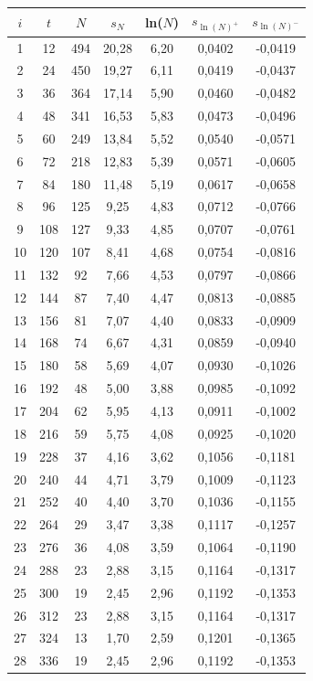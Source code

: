 \renewcommand{\arraystretch}{1.0}
\begin{table}[H]
 \begin{tabular}{c|c|c|c|c|c|c}
 $i$ & $t$ & $N$ & $s_N$ & ln($N$) & $s_{\ln(N)^+}$ & $s_{\ln(N)^-}$ \\
 \hline
1&	12&	494&	20,28&	6,20&	0,0402&	-0,0419\\
2&	24&	450&	19,27&	6,11&	0,0419&	-0,0437\\
3&	36&	364&	17,14&	5,90&	0,0460&	-0,0482\\
4&	48&	341&	16,53&	5,83&	0,0473&	-0,0496\\
5&	60&	249&	13,84&	5,52&	0,0540&	-0,0571\\
6&	72&	218&	12,83&	5,39&	0,0571&	-0,0605\\
7&	84&	180&	11,48&	5,19&	0,0617&	-0,0658\\
8&	96&	125&	9,25&	4,83&	0,0712&	-0,0766\\
9&	108&	127&	9,33&	4,85&	0,0707&	-0,0761\\
10&	120&	107&	8,41&	4,68&	0,0754&	-0,0816\\
\hline
11&	132&	92&	7,66&	4,53&	0,0797&	-0,0866\\
12&	144&	87&	7,40&	4,47&	0,0813&	-0,0885\\
13&	156&	81&	7,07&	4,40&	0,0833&	-0,0909\\
14&	168&	74&	6,67&	4,31&	0,0859&	-0,0940\\
15&	180&	58&	5,69&	4,07&	0,0930&	-0,1026\\
16&	192&	48&	5,00&	3,88&	0,0985&	-0,1092\\
17&	204&	62&	5,95&	4,13&	0,0911&	-0,1002\\
18&	216&	59&	5,75&	4,08&	0,0925&	-0,1020\\
19&	228&	37&	4,16&	3,62&	0,1056&	-0,1181\\
20&	240&	44&	4,71&	3,79&	0,1009&	-0,1123\\
21&	252&	40&	4,40&	3,70&	0,1036&	-0,1155\\
22&	264&	29&	3,47&	3,38&	0,1117&	-0,1257\\
23&	276&	36&	4,08&	3,59&	0,1064&	-0,1190\\
24&	288&	23&	2,88&	3,15&	0,1164&	-0,1317\\
25&	300&	19&	2,45&	2,96&	0,1192&	-0,1353\\
26&	312&	23&	2,88&	3,15&	0,1164&	-0,1317\\
\hline
27&	324&	13&	1,70&	2,59&	0,1201&	-0,1365\\
28&	336&	19&	2,45&	2,96&	0,1192&	-0,1353\\

\end{tabular}
\end{table}
